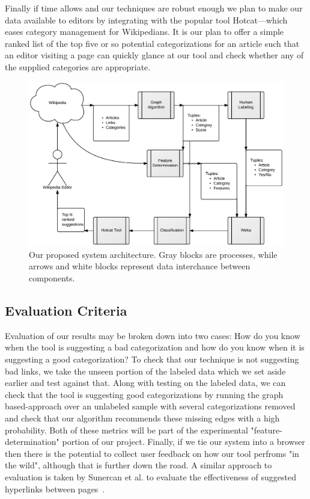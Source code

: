 \documentclass{sig-alternate}
\begin{document}
Finally if time allows and our techniques are robust enough we plan to make our data available to editors by integrating with the popular tool Hotcat---which eases category management for Wikipedians. It is our plan to offer a simple ranked list of the top five or so potential categorizations for an article such that an editor visiting a page can quickly glance at our tool and check whether any of the supplied categories are appropriate.
\begin{figure}[htb!]
	\begin{center}
		\includegraphics[width=1.0\linewidth]{block_diagram}
	\end{center}
	\vspace{-12pt}
	\caption{Our proposed system architecture. Gray blocks are processes, while arrows and white blocks represent data interchance between components.}
	\label{fig:block_diagram}
\end{figure}

\subsection{Evaluation Criteria}
\label{subsec:eval_criteria}
Evaluation of our results may be broken down into two cases: How do you know when the tool is suggesting a bad categorization and how do you know when it is suggesting a good categorization? To check that our technique is not suggesting bad links, we take the unseen portion of the labeled data which we set aside earlier and test against that. Along with testing on the labeled data, we can check that the tool is suggesting good categorizations by running the graph based-approach over an unlabeled sample with several categorizations removed and check that our algorithm recommends these missing edges with a high probability. Both of these metrics will be part of the experimental "feature-determination" portion of our project. Finally, if we tie our system into a browser then there is the potential to collect user feedback on how our tool perfroms "in the wild", although that is further down the road. A similar approach to evaluation is taken by Sunercan et al.  to evaluate the effectiveness of suggested hyperlinks between pages~\cite{Sunercan}.
\end{document}
